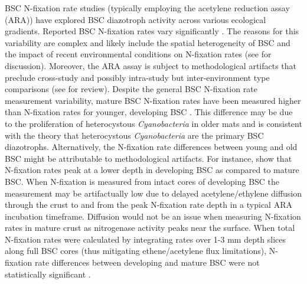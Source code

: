 BSC N-fixation rate studies (typically employing the acetylene reduction assay
(ARA)) have explored BSC diazotroph activity across various ecological
gradients. Reported BSC N-fixation rates vary significantly \citep{Evans_2001}.
The reasons for this variability are complex and likely include the spatial
heterogeneity of BSC \citep{Evans_2001} and the impact of recent environmental
conditions on N-fixation rates (see \citet{Belnap_2001} for discussion).
Moreover, the ARA assay is subject to methodological artifacts that preclude
cross-study and possibly intra-study but inter-environment type comparisons
(see \citet{Belnap_2001} for review). Despite the general BSC N-fixation rate
measurement variability, mature BSC N-fixation rates have been measured
higher than N-fixation rates for younger, developing BSC \citep{Belnap_2002,
14766579}. This difference may be due to the proliferation of heterocystous
\textit{Cyanobacteria} in older mats and is consistent with the theory that
heterocystous \textit{Cyanobacteria} are the primary BSC diazotrophs.
Alternatively, the N-fixation rate differences between young and old BSC might
be attributable to methodological artifacts. For instance, \citet{15643930}
show that N-fixation rates peak at a lower depth in developing BSC as compared
to mature BSC. When N-fixation is measured from intact cores of developing BSC
the measurement may be artifactually low due to delayed acetylene/ethylene
diffusion through the crust to and from the peak N-fixation rate depth in a
typical ARA incubation timeframe. Diffusion would not be an issue when
measuring N-fixation rates in mature crust as nitrogenase activity peaks near
the surface. When total N-fixation rates were calculated by integrating
rates over 1-3 mm depth slices along full BSC cores (thus
mitigating ethene/acetylene flux limitations), N-fixation rate differences
between developing and mature BSC were not statistically significant
\citep{15643930}.


